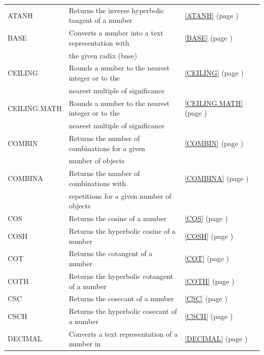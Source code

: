 \begin{center}
\begin{longtable}{l l l }
		ATANH & Returns the inverse hyperbolic tangent of a number &  \ref{ATANH} (page \pageref{ATANH}) \index{Spreadsheet Functions!ATANH} \\
		BASE  & Converts a number into a text representation with &  \ref{BASE} (page \pageref{BASE}) \index{Spreadsheet Functions!BASE} \\
		& the given radix (base)  &   \\
		CEILING & Rounds a number to the nearest integer or to the &  \ref{CEILING} (page \pageref{CEILING}) \index{Spreadsheet Functions!CEILING} \\
		& nearest multiple of significance &   \\
		CEILING.MATH & Rounds a number to the nearest integer or to the &  \ref{CEILING.MATH} (page \pageref{CEILING.MATH}) \index{Spreadsheet Functions!CEILING.MATH} \\
		& nearest multiple of significance &   \\
		COMBIN & Returns the number of combinations for a given &  \ref{COMBIN} (page \pageref{COMBIN}) \index{Spreadsheet Functions!COMBIN} \\
		& number of objects &  \\
		COMBINA & Returns the number of combinations with &  \ref{COMBINA} (page \pageref{COMBINA}) \index{Spreadsheet Functions!COMBINA} \\
		& repetitions for a given number of objects &  \\
		COS   & Returns the cosine of a number &  \ref{COS} (page \pageref{COS}) \index{Spreadsheet Functions!COS} \\
		COSH  & Returns the hyperbolic cosine of a number &  \ref{COSH} (page \pageref{COSH}) \index{Spreadsheet Functions!COSH} \\
		COT   & Returns the cotangent of a number &  \ref{COT} (page \pageref{COT}) \index{Spreadsheet Functions!COT} \\
		COTH  & Returns the hyperbolic cotangent of a number &  \ref{COTH} (page \pageref{COTH}) \index{Spreadsheet Functions!COTH} \\
		CSC  & Returns the cosecant of a number &  \ref{CSC} (page \pageref{CSC}) \index{Spreadsheet Functions!CSC} \\
		CSCH  & Returns the hyperbolic cosecant of a number &  \ref{CSCH} (page \pageref{CSCH}) \index{Spreadsheet Functions!CSCH} \\
		DECIMAL & Converts a text representation of a number in &  \ref{DECIMAL} (page \pageref{DECIMAL}) \index{Spreadsheet Functions!DECIMAL} \\

\end{longtable}
\end{center}
